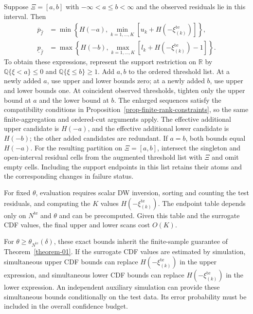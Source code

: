 \documentclass[review,11pt,3p,authoryear,nopreprintline]{elsarticle}
\begin{document}
\begin{remark}
  \label{rem-interval-support}
  Suppose $\Xi=[a,b]$ with $-\infty<a\le b<\infty$ and the observed residuals lie in this interval. Then
  \begin{align*}
    \overline p_{\hat f}
    &=\min\left\{H(-a),\min_{k=1,\ldots,K}[u_k+H\left(-\xi_{(k)}^{\mathrm{te}}\right)]\right\},\\
    \underline p_{\hat f}
    &=\max\left\{H(-b),\max_{k=1,\ldots,K}[l_k+H\left(-\xi_{(k)}^{\mathrm{te}}\right)-1]\right\}.
  \end{align*}
  To obtain these expressions, represent the support restriction on $\mathbb R$ by
  $\mathbb Q\{\xi<a\}\le0$ and $\mathbb Q\{\xi\le b\}\ge1$.
  Add $a,b$ to the ordered threshold list. At a newly added $a$, use upper and lower bounds zero; at a newly added $b$, use upper and lower bounds one. At coincident observed thresholds, tighten only the upper bound at $a$ and the lower bound at $b$. The enlarged sequences satisfy the compatibility conditions in Proposition~\ref{prop-finite-rank-constraints}, so the same finite-aggregation and ordered-cut arguments apply. The effective additional upper candidate is $H(-a)$, and the effective additional lower candidate is $H(-b)$; the other added candidates are redundant. If $a=b$, both bounds equal $H(-a)$. For the resulting partition on $\Xi=[a,b]$, intersect the singleton and open-interval residual cells from the augmented threshold list with $\Xi$ and omit empty cells. Including the support endpoints in this list retains their atoms and the corresponding changes in failure status.
\end{remark}

For fixed $\theta$, evaluation requires scalar DW inversion, sorting and counting the test residuals, and computing the $K$ values $H\left(-\xi_{(k)}^{\mathrm{te}}\right)$. The endpoint table depends only on $N^{\mathrm{te}}$ and $\theta$ and can be precomputed. Given this table and the surrogate CDF values, the final upper and lower scans cost $O(K)$.

For $\theta\ge\theta_{N^{\mathrm{te}}}(\delta)$, these exact bounds inherit the finite-sample guarantee of Theorem~\ref{theorem-01}. If the surrogate CDF values are estimated by simulation, simultaneous upper CDF bounds can replace $H\left(-\xi_{(k)}^{\mathrm{te}}\right)$ in the upper expression, and simultaneous lower CDF bounds can replace $H\left(-\xi_{(k)}^{\mathrm{te}}\right)$ in the lower expression. An independent auxiliary simulation can provide these simultaneous bounds conditionally on the test data. Its error probability must be included in the overall confidence budget.




\end{document}
